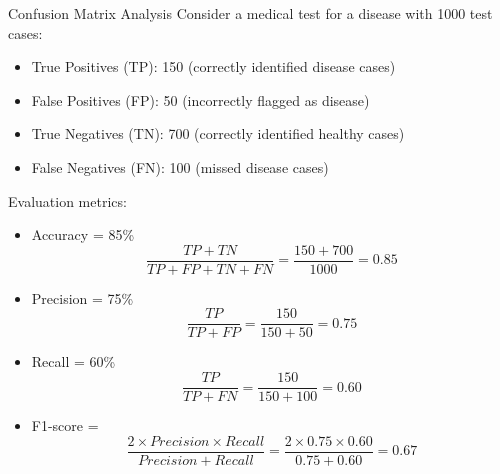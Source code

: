 \begin{example2}{Confusion Matrix Analysis}
Consider a medical test for a disease with 1000 test cases:
\begin{itemize}
    \item True Positives (TP): 150 (correctly identified disease cases)
    \item False Positives (FP): 50 (incorrectly flagged as disease)
    \item True Negatives (TN): 700 (correctly identified healthy cases)
    \item False Negatives (FN): 100 (missed disease cases)
\end{itemize}

Evaluation metrics:
\begin{itemize}
    \item Accuracy = 85\% $$\frac{TP+TN}{TP+FP+TN+FN} = \frac{150+700}{1000} = 0.85$$ 
    \item Precision = 75\% $$\frac{TP}{TP+FP} = \frac{150}{150+50} = 0.75$$ 
    \item Recall = 60\% $$\frac{TP}{TP+FN} = \frac{150}{150+100} = 0.60$$ 
    \item F1-score = $$\frac{2 \times Precision \times Recall}{Precision + Recall} = \frac{2 \times 0.75 \times 0.60}{0.75 + 0.60} = 0.67$$
\end{itemize}
\end{example2}


\multend